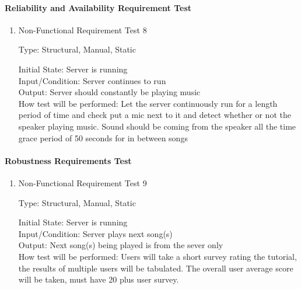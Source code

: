 \documentclass[12pt, titlepage]{article}
\begin{document}
\paragraph{Reliability and Availability Requirement Test}

\begin{enumerate}

\item{Non-Functional Requirement Test 8\\}

Type: Structural, Manual, Static
					
Initial State: Server is running \\
					
Input/Condition: Server continues to run \\
					
Output: Server should constantly be playing music \\
					
How test will be performed: Let the server continuously run for a length period of time and check
put a mic next to it and detect whether or not the speaker playing music. Sound should be coming 
from the speaker all the time grace period of 50 seconds for in between songs \\
\end{enumerate}


\paragraph{Robustness Requirements Test}

\begin{enumerate}

\item{Non-Functional Requirement Test 9\\}

Type: Structural, Manual, Static
					
Initial State: Server is running \\
					
Input/Condition: Server plays next song(s) \\
					
Output: Next song(s) being played is from the sever only \\
					
How test will be performed: Users will take a short survey rating the tutorial, the results of multiple users will be
tabulated. The overall user average score will be taken, must have 20 plus user survey. \\
\end{enumerate}
\end{document}

